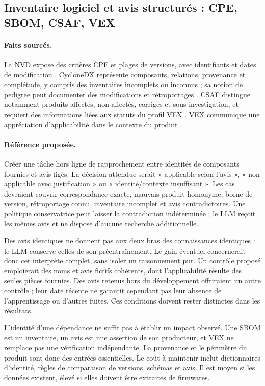 \documentclass[11pt,a4paper]{article}
\begin{document}
\subsection{Inventaire logiciel et avis structurés : CPE, SBOM, CSAF, VEX}
\paragraph{Faits sourcés.}
La NVD expose des critères CPE et plages de versions, avec identifiants et dates de modification \cite{nvd}. CycloneDX représente composants, relations, provenance et complétude, y compris des inventaires incomplets ou inconnus ; sa notion de pedigree peut documenter des modifications et rétroportages \cite{cyclonedx}. CSAF distingue notamment produits affectés, non affectés, corrigés et sous investigation, et requiert des informations liées aux statuts du profil VEX \cite{csaf}. VEX communique une appréciation d'applicabilité dans le contexte du produit \cite{vex}.

\paragraph{Référence proposée.}
Créer une tâche hors ligne de rapprochement entre identités de composants fournies et avis figés. La décision attendue serait « applicable selon l'avis », « non applicable avec justification » ou « identité/contexte insuffisant ». Les cas devraient couvrir correspondance exacte, mauvais produit homonyme, borne de version, rétroportage connu, inventaire incomplet et avis contradictoires. Une politique conservatrice peut laisser la contradiction indéterminée ; le LLM reçoit les mêmes avis et ne dispose d'aucune recherche additionnelle.

Des avis identiques ne donnent pas aux deux bras des connaissances identiques : le LLM conserve celles de son préentraînement. Le gain éventuel concernerait donc cet interprète complet, sans isoler un raisonnement pur. Un contrôle proposé emploierait des noms et avis fictifs cohérents, dont l'applicabilité résulte des seules pièces fournies. Des avis retenus hors du développement offriraient un autre contrôle ; leur date récente ne garantit cependant pas leur absence de l'apprentissage ou d'autres fuites. Ces conditions doivent rester distinctes dans les résultats.

L'identité d'une dépendance ne suffit pas à établir un impact observé. Une SBOM est un inventaire, un avis est une assertion de son producteur, et VEX ne remplace pas une vérification indépendante. La provenance et le périmètre du produit sont donc des entrées essentielles. Le coût à maintenir inclut dictionnaires d'identité, règles de comparaison de versions, schémas et avis. Il est moyen si les données existent, élevé si elles doivent être extraites de firmwares.
\end{document}
